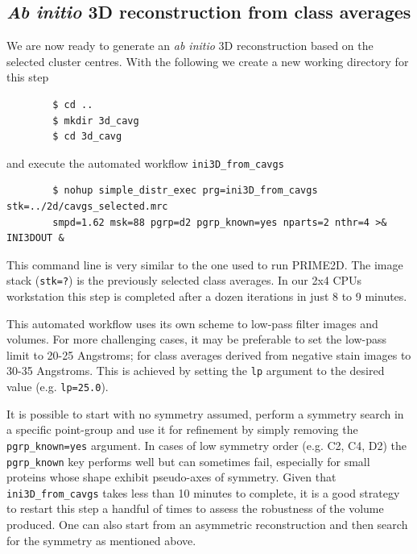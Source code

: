 \documentclass[a4paper,11pt]{article}
\begin{document}
\subsection{\textit{Ab initio} 3D reconstruction from class averages}

We are now ready to generate an \textit{ab initio} 3D reconstruction based on the selected cluster centres. With the following we create a new working directory for this step
\begin{verbatim}
        $ cd ..
        $ mkdir 3d_cavg
        $ cd 3d_cavg
\end{verbatim}
and execute the automated workflow \texttt{ini3D\_from\_cavgs}
\begin{verbatim}
        $ nohup simple_distr_exec prg=ini3D_from_cavgs stk=../2d/cavgs_selected.mrc 
        smpd=1.62 msk=88 pgrp=d2 pgrp_known=yes nparts=2 nthr=4 >& INI3DOUT &
\end{verbatim}
This command line is very similar to the one used to run PRIME2D. The image stack (\texttt{stk=?}) is the previously selected class averages. In our 2x4 CPUs workstation this step is completed after a dozen iterations in just 8 to 9 minutes.

This automated workflow uses its own scheme to low-pass filter images and volumes. For more challenging cases, it may be preferable to set the low-pass limit to 20-25 Angstroms; for class averages derived from negative stain images to 30-35 Angstroms. This is achieved by setting the \texttt{lp} argument to the desired value (e.g. \texttt{lp=25.0}).

It is possible to start with no symmetry assumed, perform a symmetry search in a specific point-group and use it for refinement by simply removing the \texttt{pgrp\_known=yes} argument. In cases of low symmetry order (e.g. C2, C4, D2) the \texttt{pgrp\_known} key performs well but can sometimes fail, especially for small proteins whose shape exhibit pseudo-axes of symmetry. Given that \texttt{ini3D\_from\_cavgs} takes less than 10 minutes to complete, it is a good strategy to restart this step a handful of times to assess the robustness of the volume produced. One can also start from an asymmetric reconstruction and then search for the symmetry as mentioned above.
\end{document}
